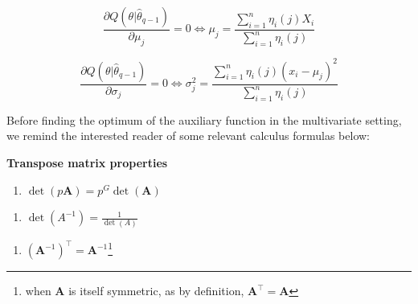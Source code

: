 \begin{equation}
 \frac{\partial Q(\theta|\hat{\theta}_{q-1})}{\partial \mu_j} = 0
 \Leftrightarrow
  \mu_j = \frac{\sum_{i=1}^n \eta_i(j) X_i}{\sum_{i=1}^n \eta_i(j)}
\label{eq:mean-univariate}
\end{equation}

\begin{equation}
 \frac{\partial Q(\theta|\hat{\theta}_{q-1})}{\partial \sigma_j} = 0
 \Leftrightarrow
\sigma_j^2  =  \frac{\sum_{i=1}^n \eta_i(j) (x_i - \mu_j)^2 }{\sum_{i=1}^n \eta_i(j)}
\label{eq:sigma-univariate}
\end{equation}

Before finding the optimum of the auxiliary function in the multivariate setting, we remind the interested reader of some relevant calculus formulas below:

\hypertarget{properties-matrix}{}
\begin{blackbox}{\textbf{Transpose matrix properties}}

\begin{cols}

\begin{col}{0.3\textwidth}

\begin{enumerate}
\def\labelenumi{\alph{enumi}.}
\tightlist
\item
  \(\operatorname{det}(p\boldsymbol{A})=p^G \operatorname{det} (\boldsymbol{A})\)
\end{enumerate}

\end{col}

\begin{col}{0.3\textwidth}

\begin{enumerate}
\def\labelenumi{\alph{enumi}.}
\setcounter{enumi}{1}
\tightlist
\item
  \(\operatorname{det}(A^{-1})=\frac{1}{\operatorname{det}(A)}\)
\end{enumerate}

\end{col}

\begin{col}{0.3\textwidth}

\begin{enumerate}
\def\labelenumi{\alph{enumi}.}
\setcounter{enumi}{2}
\tightlist
\item
  \(\left(\boldsymbol{A}^{-1} \right)^\top=\boldsymbol{A}^{-1}\)\footnote{when \(\boldsymbol{A}\) is itself symmetric, as by definition,
    \(\boldsymbol{A}^\top=\boldsymbol{A}\)}
\end{enumerate}

\end{col}

\end{cols}

\end{blackbox}

